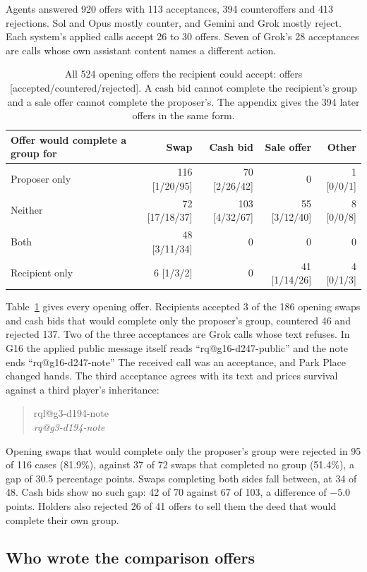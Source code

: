 \documentclass[11pt,letterpaper]{article}
\makeatletter
\newcommand{\QuoteCard}[1]{%
  \begin{quote}\small
  {\footnotesize\sffamily\color{black!65}\csname rql@#1\endcsname}\\[1pt]
  \itshape\csname rq@#1\endcsname
  \end{quote}}
\newcommand{\QuoteInline}[1]{``\csname rq@#1\endcsname''}
\makeatother
\begin{document}
Agents answered 920 offers with 113 acceptances, 394 counteroffers and 413 rejections. Sol and Opus mostly counter, and Gemini and Grok mostly reject. Each system's applied calls accept 26 to 30 offers. Seven of Grok's 28 acceptances are calls whose own assistant content names a different action.

\begin{table}[htbp]\centering\small
\begin{tabular}{@{}lrrrr@{}}\toprule
Offer would complete a group for & Swap & Cash bid & Sale offer & Other\\\midrule
Proposer only & 116 [1/20/95] & 70 [2/26/42] & 0 & 1 [0/0/1]\\
Neither & 72 [17/18/37] & 103 [4/32/67] & 55 [3/12/40] & 8 [0/0/8]\\
Both & 48 [3/11/34] & 0 & 0 & 0\\
Recipient only & 6 [1/3/2] & 0 & 41 [1/14/26] & 4 [0/1/3]\\\bottomrule
\end{tabular}
\caption{All 524 opening offers the recipient could accept: offers [accepted/countered/rejected]. A cash bid cannot complete the recipient's group and a sale offer cannot complete the proposer's. The appendix gives the 394 later offers in the same form.}
\label{tab:opening}
\end{table}

Table~\ref{tab:opening} gives every opening offer. Recipients accepted 3 of the 186 opening swaps and cash bids that would complete only the proposer's group, countered 46 and rejected 137. Two of the three acceptances are Grok calls whose text refuses. In G16 the applied public message itself reads \QuoteInline{g16-d247-public} and the note ends \QuoteInline{g16-d247-note} The received call was an acceptance, and Park Place changed hands. The third acceptance agrees with its text and prices survival against a third player's inheritance:
\QuoteCard{g3-d194-note}

Opening swaps that would complete only the proposer's group were rejected in 95 of 116 cases (81.9\%), against 37 of 72 swaps that completed no group (51.4\%), a gap of 30.5 percentage points. Swaps completing both sides fall between, at 34 of 48. Cash bids show no such gap: 42 of 70 against 67 of 103, a difference of $-5.0$ points. Holders also rejected 26 of 41 offers to sell them the deed that would complete their own group.

\subsection{Who wrote the comparison offers}
\end{document}
